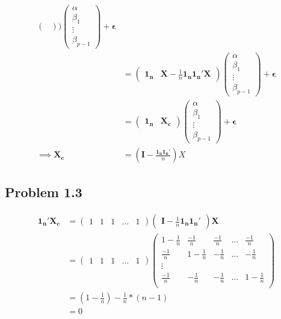 \documentclass[a4paper]{article}
\begin{document}
\begin{align*}
\begin{pmatrix}
\end{pmatrix}\big)\begin{pmatrix}
\alpha\\
\beta_1\\
\vdots\\
\beta_{p-1}
\end{pmatrix} + \mathbf{\epsilon}\\
&= \begin{pmatrix}
\mathbf{1_n} & \mathbf{X}-\frac{1}{n}\mathbf{1_n1_n'X}
\end{pmatrix}\begin{pmatrix}
\alpha\\
\beta_1\\
\vdots\\
\beta_{p-1}
\end{pmatrix}+ \mathbf{\epsilon}\\
&= \begin{pmatrix}
\mathbf{1_n} & \mathbf{X_c}
\end{pmatrix}\begin{pmatrix}
\alpha\\
\beta_1\\
\vdots\\
\beta_{p-1}
\end{pmatrix}+ \mathbf{\epsilon}\\
\implies \mathbf{X_c} &= (\mathbf{I}-\frac{\mathbf{1_n1_n'}}{n})X
\end{align*}

\subsection*{Problem 1.3}

\begin{align*}
\mathbf{1_n'X_c} &= \begin{pmatrix}
1 & 1 & 1 & \dots & 1
\end{pmatrix} \begin{pmatrix}
\mathbf{I}-\frac{1}{n}\mathbf{1_n1_n'}
\end{pmatrix}\mathbf{X}\\
&= \begin{pmatrix}
1 & 1 & 1 & \dots & 1
\end{pmatrix} \begin{pmatrix}
1-\frac{1}{n} & \frac{-1}{n} & \frac{-1}{n} & \dots & \frac{-1}{n}\\
\frac{-1}{n} &1-\frac{1}{n} & -\frac{1}{n} & \dots & -\frac{1}{n}\\
\vdots\\
\frac{-1}{n} &-\frac{1}{n} & -\frac{1}{n} & \dots & 1-\frac{1}{n}\\
\end{pmatrix}\\
&= (1-\frac{1}{n}) -\frac{1}{n}*(n-1)\\
&= 0
\end{align*}
\end{document}
